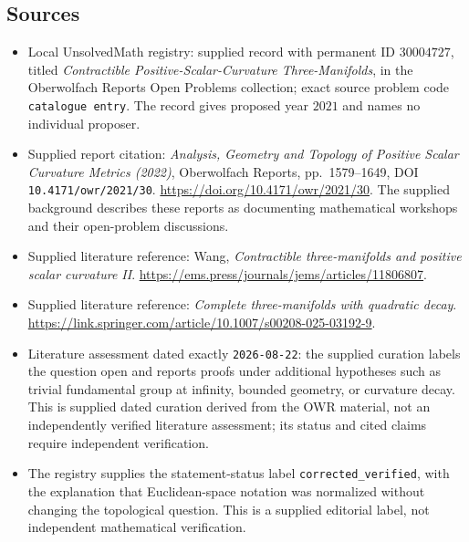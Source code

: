 \documentclass[11pt]{article}
\begin{document}
\subsection{Sources}
\begin{itemize}
\item Local UnsolvedMath registry: supplied record with permanent ID \(30004727\), titled \emph{Contractible Positive-Scalar-Curvature Three-Manifolds}, in the Oberwolfach Reports Open Problems collection; exact source problem code \texttt{catalogue entry}. The record gives proposed year \(2021\) and names no individual proposer.
\item Supplied report citation: \emph{Analysis, Geometry and Topology of Positive Scalar Curvature Metrics (2022)}, Oberwolfach Reports, pp.~1579--1649, DOI \texttt{10.4171/owr/2021/30}. \url{https://doi.org/10.4171/owr/2021/30}. The supplied background describes these reports as documenting mathematical workshops and their open-problem discussions.
\item Supplied literature reference: Wang, \emph{Contractible three-manifolds and positive scalar curvature II}. \url{https://ems.press/journals/jems/articles/11806807}.
\item Supplied literature reference: \emph{Complete three-manifolds with quadratic decay}. \url{https://link.springer.com/article/10.1007/s00208-025-03192-9}.
\item Literature assessment dated exactly \texttt{2026-08-22}: the supplied curation labels the question open and reports proofs under additional hypotheses such as trivial fundamental group at infinity, bounded geometry, or curvature decay. This is supplied dated curation derived from the OWR material, not an independently verified literature assessment; its status and cited claims require independent verification.
\item The registry supplies the statement-status label \texttt{corrected\_verified}, with the explanation that Euclidean-space notation was normalized without changing the topological question. This is a supplied editorial label, not independent mathematical verification.
\end{itemize}
\end{document}
